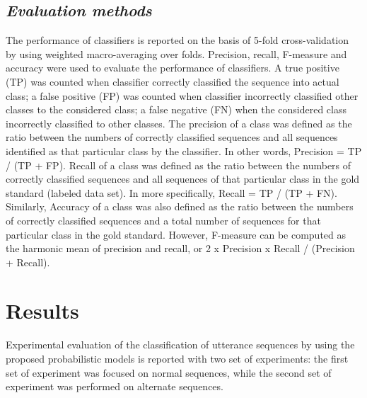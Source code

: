 \documentclass{amia}
\begin{document}
\subsection*{\textit{Evaluation methods}}
The performance of classifiers is reported on the basis of 5-fold cross-validation by using weighted macro-averaging over folds. Precision, recall, F-measure and accuracy were used to evaluate the performance of classifiers. A true positive (TP) was counted when classifier correctly classified the sequence into actual class; a false positive (FP) was counted when classifier incorrectly classified other classes to the considered class; a false negative (FN) when the considered class incorrectly classified to other classes. The precision of a class was defined as the ratio between the numbers of correctly classified sequences and all sequences identified as that particular class by the classifier. In other words, Precision = TP / (TP + FP). Recall of a class was defined as the ratio between the numbers of correctly classified sequences and all sequences of that particular class in the gold standard (labeled data set). In more specifically, Recall = TP / (TP + FN). Similarly, Accuracy of a class was also defined as the ratio between the numbers of correctly classified sequences and a total number of sequences for that particular class in the gold standard. However, F-measure can be computed as the harmonic mean of precision and recall, or 2 x Precision x Recall / (Precision + Recall).  

\section*{Results}
Experimental evaluation of the classification of utterance sequences by using the proposed probabilistic models is reported with two set of experiments: the first set of experiment was focused on normal sequences, while the second set of experiment was performed on alternate sequences. 
\end{document}
